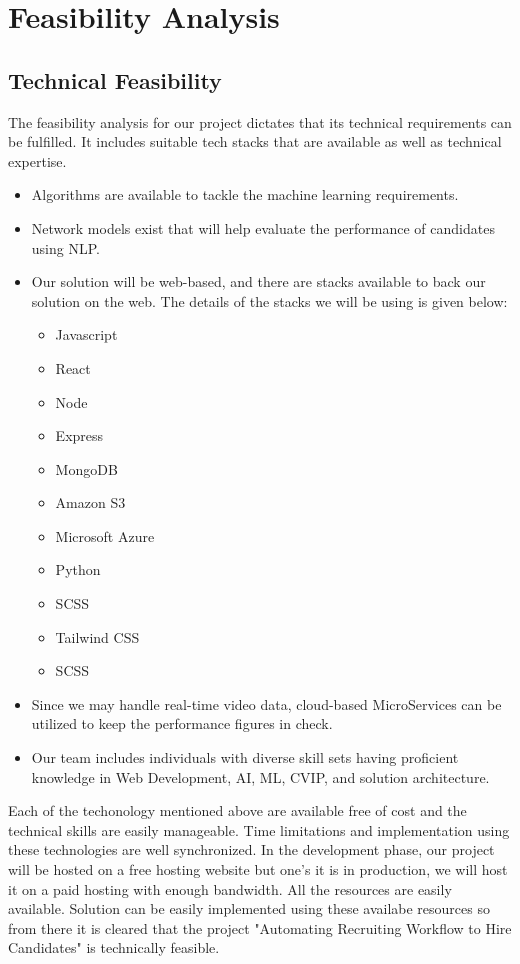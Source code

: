 \section{Feasibility Analysis}
\subsection{Technical Feasibility}
The feasibility analysis for our project dictates that its technical requirements can be fulfilled. It includes suitable tech stacks that are available as well as technical expertise. 
\begin{itemize}
    \item Algorithms are available to tackle the machine learning requirements. 
    \item Network models exist that will help evaluate the performance of candidates using NLP. 
    \item Our solution will be web-based, and there are stacks available to back our solution on the web. The details of the stacks we will be using is given below:
    \begin{itemize}
        \item Javascript
        \item React
        \item Node
        \item Express
        \item MongoDB
        \item Amazon S3
        \item Microsoft Azure
        \item Python
        \item SCSS
        \item Tailwind CSS
        \item SCSS
    \end{itemize}
    \item Since we may handle real-time video data, cloud-based MicroServices can be utilized to keep the performance figures in check. 
    \item Our team includes individuals with diverse skill sets having proficient knowledge in Web Development, AI, ML, CVIP, and solution architecture.
\end{itemize}

Each of the techonology mentioned above are available free of cost and the technical skills are easily manageable. Time limitations and implementation using these technologies are well synchronized. In the development phase, our project will be hosted on a free hosting website but one's it is in production, we will host it on a paid hosting with enough bandwidth. All the resources are easily available. Solution can be easily implemented using these availabe resources so from there it is cleared that the project "Automating Recruiting Workflow to Hire Candidates" is technically feasible.

